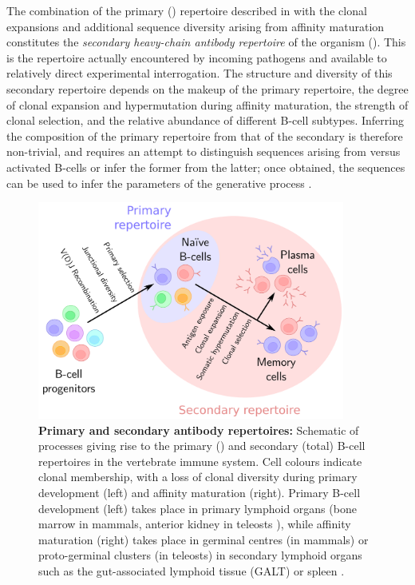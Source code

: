 The combination of the primary (\naive) repertoire described in  with the clonal expansions and additional sequence diversity arising from affinity maturation constitutes the \textit{secondary heavy-chain antibody repertoire} of the organism (). This is the repertoire actually encountered by incoming pathogens and available to relatively direct experimental interrogation. The structure and diversity of this secondary repertoire depends on the makeup of the primary repertoire, the degree of clonal expansion and hypermutation during affinity maturation, the strength of clonal selection, and the relative abundance of different B-cell subtypes. Inferring the composition of the primary repertoire from that of the secondary is therefore non-trivial, and requires an attempt to distinguish sequences arising from \naive versus activated B-cells or infer the former from the latter; once obtained, the \naive sequences can be used to infer the parameters of the generative process \parencite{elhanati2015model}.

\begin{figure}
\centering
\includegraphics[width=0.9\textwidth]{_Figures/png_edited/bcell-repertoire-primary-secondary}
\caption[Primary and secondary antibody repertoires]{\textbf{Primary and secondary antibody repertoires:} Schematic of processes giving rise to the primary (\naive) and secondary (total) B-cell repertoires in the vertebrate immune system. Cell colours indicate clonal membership, with a loss of clonal diversity during primary development (left) and affinity maturation (right). Primary B-cell development (left) takes place in primary lymphoid organs (bone marrow in mammals, anterior kidney in teleosts \parencite{sunyer2013fishing}), while affinity maturation (right) takes place in germinal centres (in mammals) or proto-germinal clusters (in teleosts) in secondary lymphoid organs such as the gut-associated lymphoid tissue (GALT) or spleen \parencite{victora2012gc,magor2015affinity}.}
\label{fig:intro-bcell-repertoires}
\end{figure}


